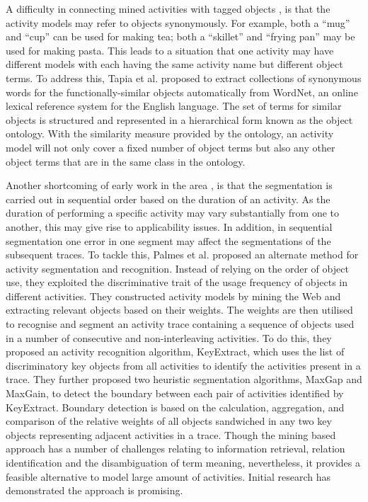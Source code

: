 A difficulty in connecting mined activities with tagged objects \cite{Perkowitz2004}, \cite{Wyatt2005} is that the activity models may refer to objects synonymously. For example, both a “mug” and “cup” can be used for making tea; both a “skillet” and “frying pan” may be used for making pasta. This leads to a situation that one activity may have different models with each having the same activity name but different object terms. To address this, Tapia et al. \cite{Tapia2006} proposed to extract collections of synonymous words for the functionally-similar objects automatically from WordNet, an online lexical reference system for the English language. The set of terms for similar objects is structured and represented in a hierarchical form known as the object ontology. With the similarity measure provided by the ontology, an activity model will not only cover a fixed number of object terms but also any other object terms that are in the same class in the ontology. 

Another shortcoming of early work in the area \cite{Perkowitz2004}, \cite{Wyatt2005} is that the segmentation is carried out in sequential order based on the duration of an activity. As the duration of performing a specific activity may vary substantially from one to another, this may give rise to applicability issues. In addition, in sequential segmentation one error in one segment may affect the segmentations of the subsequent traces. To tackle this, Palmes et al. \cite{Palmes2010} proposed an alternate method for activity segmentation and recognition. Instead of relying on the order of object use, they exploited the discriminative trait of the usage frequency of objects in different activities. They constructed activity models by mining the Web and extracting relevant objects based on their weights. The weights are then utilised to recognise and segment an activity trace containing a sequence of objects used in a number of consecutive and non-interleaving activities. To do this, they proposed an activity recognition algorithm, KeyExtract, which uses the list of discriminatory key objects from all activities to identify the activities present in a trace. They further proposed two heuristic segmentation algorithms, MaxGap and MaxGain, to detect the boundary between each pair of activities identified by KeyExtract. Boundary detection is based on the calculation, aggregation, and comparison of the relative weights of all objects sandwiched in any two key objects representing adjacent activities in a trace. Though the mining based approach has a number of challenges relating to information retrieval, relation identification and the disambiguation of term meaning, nevertheless, it provides a feasible alternative to model large amount of activities. Initial research has demonstrated the approach is promising. 

